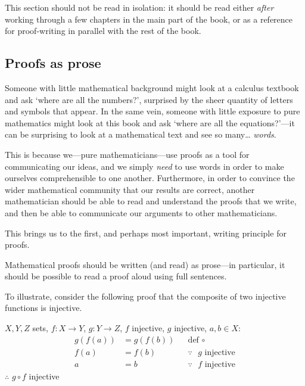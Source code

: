 This section should not be read in isolation: it should be read either \textit{after} working through a few chapters in the main part of the book, or as a reference for proof-writing in parallel with the rest of the book.

\subsection*{Proofs as prose}

Someone with little mathematical background might look at a calculus textbook and ask `where are all the numbers?', surprised by the sheer quantity of letters and symbols that appear.  In the same vein, someone with little exposure to pure mathematics might look at this book and ask `where are all the equations?'---it can be surprising to look at a mathematical text and see so many\dots{} \textit{words}.

This is because we---pure mathematicians---use proofs as a tool for communicating our ideas, and we simply \textit{need} to use words in order to make ourselves comprehensible to one another. Furthermore, in order to convince the wider mathematical community that our results are correct, another mathematician should be able to read and understand the proofs that we write, and then be able to communicate our arguments to other mathematicians.

This brings us to the first, and perhaps most important, writing principle for proofs.

\begin{writingprinciple}
\label{wpFullSentences}
Mathematical proofs should be written (and read) as prose---in particular, it should be possible to read a proof aloud using full sentences.
\end{writingprinciple}

To illustrate, consider the following proof that the composite of two injective functions is injective.

\begin{extract}
\label{xtrInjectiveNoProse}
$X,Y,Z$ sets, $f : X \to Y$, $g : Y \to Z$, $f$ injective, $g$ injective, $a,b \in X$:
\begin{align*}
g(f(a)) &= g(f(b)) && \text{def $\circ$} \\
f(a) &= f(b) && \text{$\because$ $g$ injective} \\
a &= b && \text{$\because$ $f$ injective}
\end{align*}
$\therefore$ $g \circ f$ injective
\end{extract}

